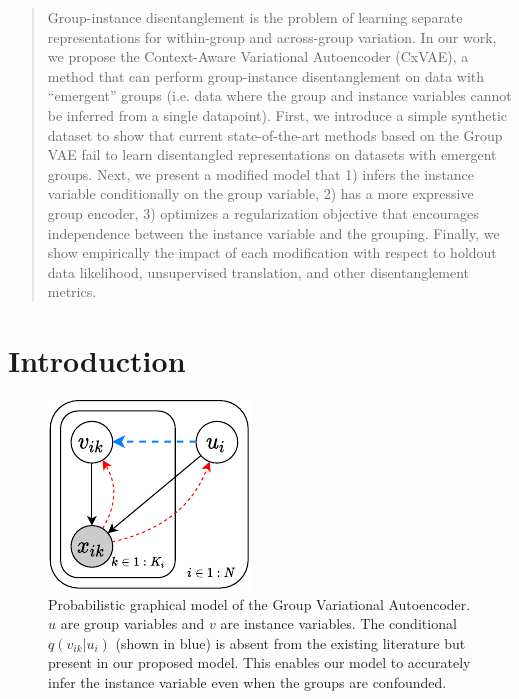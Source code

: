 \documentclass[nohyperref]{article}
\theoremstyle{plain}
\theoremstyle{definition}
\theoremstyle{remark}
\begin{document}
\begin{abstract}
Group-instance disentanglement is the problem of learning separate representations for within-group and across-group variation.  In our work,  we propose the Context-Aware Variational Autoencoder (CxVAE), a method that can perform group-instance disentanglement on data with ``emergent'' groups (i.e.  data where the group and instance variables cannot be inferred from a single datapoint). First,  we introduce a simple synthetic dataset to show that current state-of-the-art methods based on the Group VAE fail to learn disentangled representations on datasets with emergent groups. Next, we present a modified model that 1) infers the instance variable conditionally on the group variable, 2) has a more expressive group encoder, 3) optimizes a regularization objective that encourages independence between the instance variable and the grouping. Finally, we show empirically the impact of each modification with respect to holdout data likelihood, unsupervised translation, and other disentanglement metrics.
\end{abstract}

\section{Introduction}
\label{intro}

\begin{figure}[t]
    \vskip 0.2in
    \begin{center}
    \centerline{\includegraphics[width=0.7\columnwidth]{files/bayes_net_one.pdf}}
    \caption{Probabilistic graphical model of the Group Variational Autoencoder.  $u$ are group variables and $v$ are instance variables. The conditional $q(v_{ik} | u_i)$ (shown in blue) is absent from the existing literature but present in our proposed model. This enables our model to accurately infer the instance variable even when the groups are confounded. }
    \label{bayes-net}
    \end{center}
    \vskip -0.2in
\end{figure}
\end{document}
